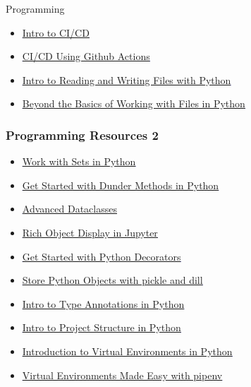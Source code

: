 \documentclass[handout, 11pt]{beamer}
\begin{document}
\begin{section}{Programming}
\begin{frame}
\begin{itemize}
\vfill
\item \textcolor{blue}{\underline{\href{https://semaphoreci.com/blog/cicd-pipeline}{Intro to CI/CD}}}
\vfill
\item \textcolor{blue}{\underline{\href{https://github.com/features/actions}{CI/CD Using Github Actions}}}
\vfill
\item \textcolor{blue}{\underline{\href{https://www.pythonforbeginners.com/files/reading-and-writing-files-in-python}{Intro to Reading and Writing Files with Python}}}
\vfill
\item \textcolor{blue}{\underline{\href{https://realpython.com/python-pathlib/}{Beyond the Basics of Working with Files in Python}}}
\end{itemize}
\end{frame}
\begin{frame}
\frametitle{Programming Resources 2}
\begin{itemize}
\small
\vfill
\item \textcolor{blue}{\underline{\href{https://realpython.com/python-sets/}{Work with Sets in Python}}}
\vfill
\item \textcolor{blue}{\underline{\href{https://dbader.org/blog/python-dunder-methods}{Get Started with Dunder Methods in Python}}}
\vfill
\item \textcolor{blue}{\underline{\href{https://realpython.com/python-data-classes/}{Advanced Dataclasses}}}
\vfill
\item \textcolor{blue}{\underline{\href{https://ipython.readthedocs.io/en/stable/config/integrating.html}{Rich Object Display in Jupyter}}}
\vfill
\item \textcolor{blue}{\underline{\href{https://realpython.com/primer-on-python-decorators/}{Get Started with Python Decorators}}}
\vfill
\item \textcolor{blue}{\underline{\href{https://www.datacamp.com/community/tutorials/pickle-python-tutorial}{Store Python Objects with pickle and dill}}}
\vfill
\item \textcolor{blue}{\underline{\href{https://dev.to/dstarner/using-pythons-type-annotations-4cfe}{Intro to Type Annotations in Python}}}
\vfill
\item \textcolor{blue}{\underline{\href{https://docs.python-guide.org/writing/structure/}{Intro to Project Structure in Python}}}
\vfill
\item \textcolor{blue}{\underline{\href{https://www.dabapps.com/blog/introduction-to-pip-and-virtualenv-python/}{Introduction to Virtual Environments in Python}}}
\vfill
\item \textcolor{blue}{\underline{\href{https://realpython.com/pipenv-guide/}{Virtual Environments Made Easy with pipenv}}}
\end{itemize}
\end{frame}
\end{section}
\end{document}
